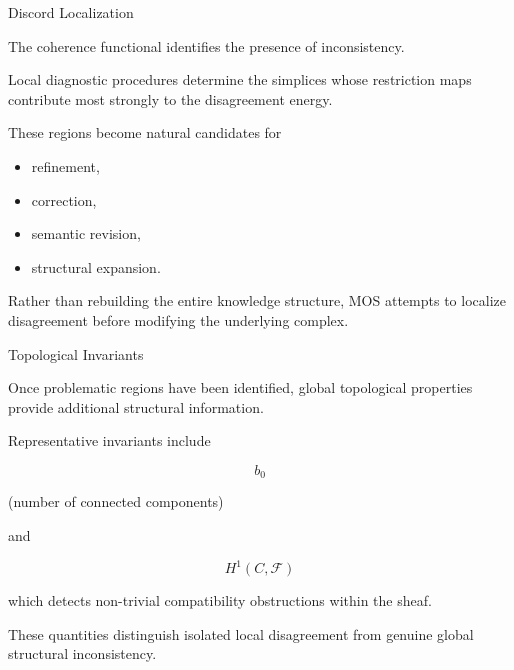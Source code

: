 
\begin{mosbox}{Discord Localization}

\BodyFont

The coherence functional identifies the presence of inconsistency.

Local diagnostic procedures determine the simplices whose restriction maps
contribute most strongly to the disagreement energy.

These regions become natural candidates for

\begin{itemize}

\item refinement,

\item correction,

\item semantic revision,

\item structural expansion.

\end{itemize}

Rather than rebuilding the entire knowledge structure, MOS attempts to
localize disagreement before modifying the underlying complex.

\end{mosbox}


\begin{mosbox}{Topological Invariants}

\BodyFont

Once problematic regions have been identified, global topological
properties provide additional structural information.

Representative invariants include

\[
\boxed{
b_0
}
\]

(number of connected components)

\vspace{2mm}

and

\[
\boxed{
H^{1}(C,\mathcal F)
}
\]

which detects non-trivial compatibility obstructions within the sheaf.

These quantities distinguish isolated local disagreement from genuine
global structural inconsistency.

\end{mosbox}


